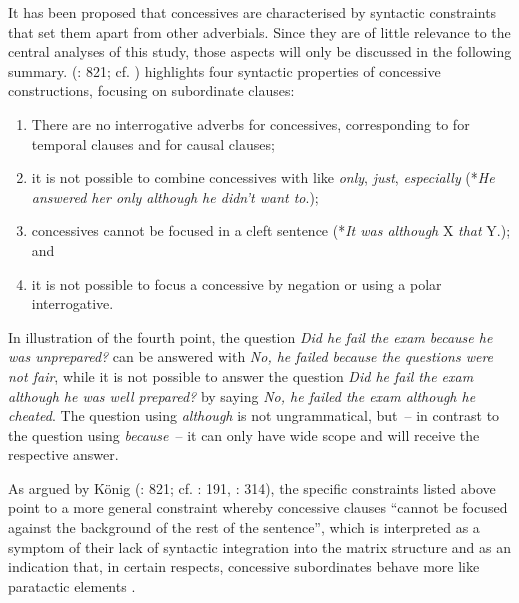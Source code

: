 \begin{sloppypar}
It has been proposed that concessives are characterised by syntactic constraints that set them apart from other adverbials. Since they are of little relevance to the central analyses of this study, those aspects will only be discussed in the following summary. \citeauthor{König2006} (\citeyear{König2006}: 821; cf. \cites[679]{König1994}[192]{König1991a}[149–151]{König1988}) highlights four syntactic properties of concessive constructions, focusing on subordinate clauses:
\end{sloppypar}

\begin{enumerate}
\item There are no interrogative adverbs for concessives, corresponding to  for temporal clauses and  for causal clauses;
\item it is not possible to combine concessives with  like \textit{only}, \textit{just}, \textit{especially} (*\textit{He answered her only although he didn’t want to}.);
\item concessives cannot be focused in a cleft sentence (*\textit{It was although} X \textit{that} Y.); and
\item it is not possible to focus a concessive by negation or using a polar interrogative.
\end{enumerate}\largerpage

In illustration of the fourth point, the question \textit{Did he fail the exam because he was unprepared?} can be answered with \textit{No, he failed because the questions were not fair}, while it is not possible to answer the question \textit{Did he fail the exam although he was well prepared?} by saying \textit{No, he failed the exam although he cheated}. The question using \textit{although} is not ungrammatical, but~– in contrast to the question using \textit{because}~– it can only have wide scope and will receive the respective answer.

As argued by König (\citeyear{König2006}: 821; cf. \citealt{König1991a}: 191, \citealt{Crevels2000}: 314), the specific constraints listed above point to a more general constraint whereby concessive clauses “cannot be focused against the background of the rest of the sentence”, which is interpreted as a symptom of their lack of syntactic integration into the matrix structure and as an indication that, in certain respects, concessive subordinates behave more like paratactic elements \citep[821]{König2006}.

